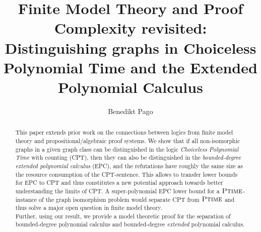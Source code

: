 \documentclass[a4paper,UKenglish,cleveref, autoref, thm-restate]{lipics-v2021}
\title{ Finite Model Theory and Proof Complexity revisited: Distinguishing graphs in Choiceless Polynomial Time and the Extended Polynomial Calculus   } %
\author{Benedikt Pago}{Mathematical Foundations of Computer Science, RWTH Aachen University, Germany }{pago@logic.rwth-aachen.de}{}{}%
\newcommand{\ptime}{\mbox{\sc Ptime}}
\begin{document}
	
	\maketitle
	
	\begin{abstract}
		This paper extends prior work on the connections between logics from finite model theory and propositional/algebraic proof systems. We show that if all non-isomorphic graphs in a given graph class can be distinguished in the logic \emph{Choiceless Polynomial Time} with counting (CPT), then they can also be distinguished in the \emph{bounded-degree extended polynomial calculus} (EPC), and the refutations have roughly the same size as the resource consumption of the CPT-sentence. 
		This allows to transfer lower bounds for EPC to CPT and thus constitutes a new potential approach towards better understanding the limits of CPT. A super-polynomial EPC lower bound for a $\ptime$-instance of the graph isomorphism problem would separate CPT from $\ptime$ and thus solve a major open question in finite model theory.\\ 
		Further, using our result, we provide a model theoretic proof for the separation of bounded-degree polynomial calculus and bounded-degree \emph{extended} polynomial calculus.
	\end{abstract}	
	
	
\end{document}
